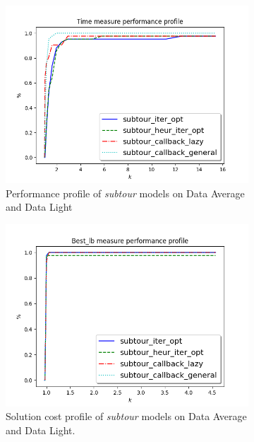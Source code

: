 \begin{figure}[h]
	\begin{subfigure}{.5\textwidth}
		\centering
		\includegraphics[width=\columnwidth]{../res/Lsubtours_lightaverage_time.png}
		\caption{Performance profile of \textit{subtour} models on Data Average and Data Light}
		\label{fig:res_subtour_av}
	\end{subfigure}
	\begin{subfigure}{.5\textwidth}
	\centering
	\includegraphics[width=\columnwidth]{../res/Lsubtours_lightaverage_lb.png}
	\caption{Solution cost profile of \textit{subtour} models on Data Average and Data Light.}
	\label{fig:res_subtour_li}
	\end{subfigure}
\caption{}
\label{fig:Lsubtours_lightaverage}
\end{figure}

